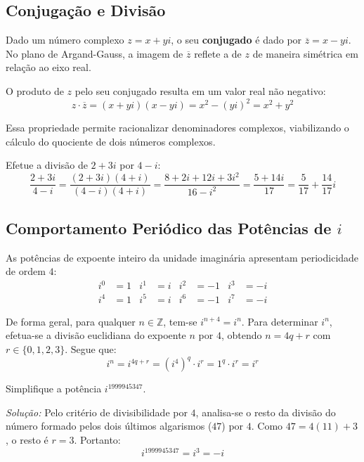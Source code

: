 \documentclass[12pt,a4paper]{article}
\begin{document}
\subsection*{Conjugação e Divisão}

Dado um número complexo $z = x + yi$, o seu \textbf{conjugado} é dado por $\overline{z} = x - yi$. No plano de Argand-Gauss, a imagem de $\overline{z}$ reflete a de $z$ de maneira simétrica em relação ao eixo real.

O produto de $z$ pelo seu conjugado resulta em um valor real não negativo:
\[
z \cdot \overline{z} = (x + yi)(x - yi) = x^2 - (yi)^2 = x^2 + y^2
\]

Essa propriedade permite racionalizar denominadores complexos, viabilizando o cálculo do quociente de dois números complexos.

\begin{exemplobox}
Efetue a divisão de $2 + 3i$ por $4 - i$:
\[
\frac{2 + 3i}{4 - i} = \frac{(2 + 3i)(4 + i)}{(4 - i)(4 + i)} = \frac{8 + 2i + 12i + 3i^2}{16 - i^2} = \frac{5 + 14i}{17} = \frac{5}{17} + \frac{14}{17}i
\]
\end{exemplobox}

\subsection*{Comportamento Periódico das Potências de $i$}

As potências de expoente inteiro da unidade imaginária apresentam periodicidade de ordem $4$:
\begin{align*}
i^0 &= 1 & i^1 &= i & i^2 &= -1 & i^3 &= -i \\
i^4 &= 1 & i^5 &= i & i^6 &= -1 & i^7 &= -i
\end{align*}

De forma geral, para qualquer $n \in \mathbb{Z}$, tem-se $i^{n+4} = i^n$. Para determinar $i^n$, efetua-se a divisão euclidiana do expoente $n$ por $4$, obtendo $n = 4q + r$ com $r \in \{0, 1, 2, 3\}$. Segue que:
\[
i^n = i^{4q+r} = (i^4)^q \cdot i^r = 1^q \cdot i^r = i^r
\]

\begin{exemplobox}
Simplifique a potência $i^{1999945347}$.

\textit{Solução:} Pelo critério de divisibilidade por $4$, analisa-se o resto da divisão do número formado pelos dois últimos algarismos ($47$) por $4$. Como $47 = 4(11) + 3$, o resto é $r = 3$. Portanto:
\[
i^{1999945347} = i^3 = -i
\]
\end{exemplobox}
\end{document}

